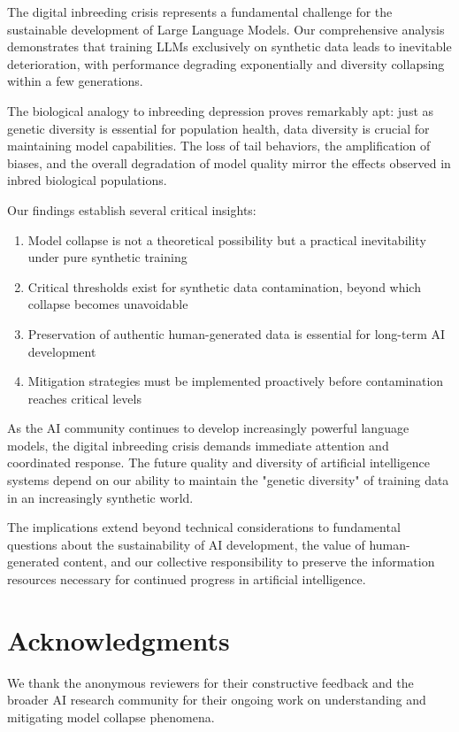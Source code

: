 \documentclass{article}
\begin{document}
The digital inbreeding crisis represents a fundamental challenge for the sustainable development of Large Language Models. Our comprehensive analysis demonstrates that training LLMs exclusively on synthetic data leads to inevitable deterioration, with performance degrading exponentially and diversity collapsing within a few generations.

The biological analogy to inbreeding depression proves remarkably apt: just as genetic diversity is essential for population health, data diversity is crucial for maintaining model capabilities. The loss of tail behaviors, the amplification of biases, and the overall degradation of model quality mirror the effects observed in inbred biological populations.

Our findings establish several critical insights:

\begin{enumerate}
\item Model collapse is not a theoretical possibility but a practical inevitability under pure synthetic training
\item Critical thresholds exist for synthetic data contamination, beyond which collapse becomes unavoidable
\item Preservation of authentic human-generated data is essential for long-term AI development
\item Mitigation strategies must be implemented proactively before contamination reaches critical levels
\end{enumerate}

As the AI community continues to develop increasingly powerful language models, the digital inbreeding crisis demands immediate attention and coordinated response. The future quality and diversity of artificial intelligence systems depend on our ability to maintain the "genetic diversity" of training data in an increasingly synthetic world.

The implications extend beyond technical considerations to fundamental questions about the sustainability of AI development, the value of human-generated content, and our collective responsibility to preserve the information resources necessary for continued progress in artificial intelligence.

\section*{Acknowledgments}

We thank the anonymous reviewers for their constructive feedback and the broader AI research community for their ongoing work on understanding and mitigating model collapse phenomena.
\end{document}
